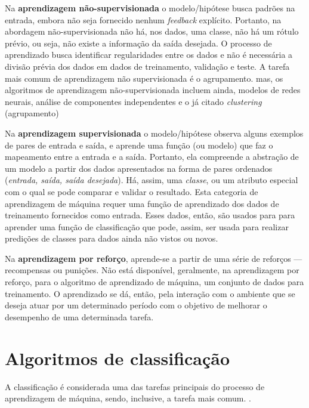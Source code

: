 Na \textbf{aprendizagem não-supervisionada} o modelo/hipótese busca padrões na entrada, embora não seja fornecido nenhum \textit{feedback} explícito. Portanto, na abordagem não-supervisionada não há, nos dados, uma classe, não há um rótulo prévio, ou seja, não existe a informação da saída desejada. O processo de aprendizado busca identificar regularidades entre os dados e não é necessária a divisão prévia dos dados em dados de treinamento, validação e teste.  A tarefa mais comum de aprendizagem não supervisionada é o agrupamento. mas, os algoritmos de aprendizagem não-supervisionada incluem ainda, modelos de redes neurais, análise de componentes independentes e o já citado \textit{clustering} (agrupamento) \cite{Norvig2013} \cite{Boscarioli2017} \cite{goldschmidt2005} \cite{aprenda_mineracao_fernando_amaral16}

Na \textbf{aprendizagem supervisionada} o modelo/hipótese observa alguns exemplos de pares de entrada e saída, e aprende uma função (ou modelo) que faz o mapeamento entre a entrada e a saída. Portanto, ela compreende a abstração de um modelo a partir dos dados apresentados na forma de pares ordenados (\textit{entrada, saída, saída desejada}). Há, assim, uma \textit{classe}, ou um atributo especial com o qual se pode comparar e validar o resultado. Esta categoria de aprendizagem de máquina requer uma função de aprendizado dos dados de treinamento fornecidos como entrada. Esses dados, então, são usados para para aprender uma função de classificação que pode, assim, ser usada para realizar predições de classes para dados ainda não vistos ou novos. \cite{Norvig2013} \cite{luger_inteligencia_2015} \cite{baeza-yates_recuperacao_2013}

Na \textbf{aprendizagem por reforço}, aprende-se a partir de uma série de reforços --- recompensas ou punições. Não está disponível, geralmente, na aprendizagem por reforço, para o algoritmo de aprendizado de máquina, um conjunto de dados para treinamento. O aprendizado se dá, então, pela interação com o ambiente que se deseja atuar por um determinado período com o objetivo de melhorar o desempenho de uma determinada tarefa. \cite{Norvig2013} \cite{aprenda_mineracao_fernando_amaral16} \cite{silva_restaurante_2019}	

\section{Algoritmos de classificação}
A classificação é considerada uma das tarefas principais do processo de aprendizagem de máquina, sendo, inclusive, a tarefa mais comum. \cite{amaral_introducao_2018} \cite{fayyad1996}.

